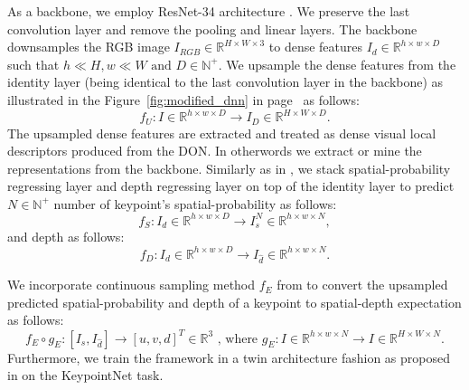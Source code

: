 As a backbone, we employ ResNet-34 architecture \cite{resnet}.
We preserve the last convolution layer and remove the pooling and linear layers. The backbone downsamples the RGB image $I_{RGB} \in \mathbb{R}^{H \times W \times 3}$
to dense features $I_d \in \mathbb{R}^{h \times w \times D}$
such that $ h \ll H, w \ll W \text{ and } D \in \mathbb{N}^+$.
We upsample the dense features from the identity layer
(being identical to the last convolution layer in the backbone) as illustrated in the Figure~\ref{fig:modified_dnn} in page~\pageref{fig:modified_dnn} as follows:
\begin{equation}
    f_U: I \in \mathbb{R}^{h \times w \times D} \rightarrow I_D \in \mathbb{R}^{H \times W \times D}.
\end{equation}
The upsampled dense features are extracted and treated as dense visual local descriptors produced from the DON. In otherwords
we extract or mine the representations from the backbone.
Similarly as in \cite{suwajanakorn2018discovery}, we stack spatial-probability regressing layer and
depth regressing layer on top of the identity layer to predict $N \in \mathbb{N}^+$ number of keypoint's spatial-probability as follows:
\begin{equation}
    f_S: I_d \in \mathbb{R}^{h \times w \times D} \rightarrow I_s^N \in \mathbb{R}^{h \times w \times N},
\end{equation}
and depth as follows:
\begin{equation}
    f_D: I_d \in \mathbb{R}^{h \times w \times D} \rightarrow I_{\hat{d}} \in \mathbb{R}^{h \times w \times N}.
\end{equation}

We incorporate continuous sampling method $f_E$ from \parencites{florence2020dense}{suwajanakorn2018discovery}
to convert the upsampled predicted spatial-probability and depth of a keypoint to spatial-depth expectation as follows:
\begin{equation}
    f_E \circ g_E:[I_s, I_{\hat{d}}] \rightarrow [u, v, d]^T \in \mathbb{R}^3 \text{ , where }  g_E: I \in \mathbb{R}^{h \times w \times N} \rightarrow I \in \mathbb{R}^{H \times W \times N}.
\end{equation}
Furthermore, we train the framework in a twin architecture fashion as proposed in
\parencites{chen2020simple}{zbontar2021barlow}{florence2018dense}{florence2020dense}{kupcsik2021supervised}{adrian2022efficient}{hadjivelichkov2021fully}{nerf-Supervision}
on the KeypointNet task.

